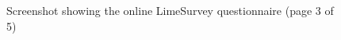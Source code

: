 \begin{figure}
\ContinuedFloat
 \centering
 \caption[Screenshot showing the online questionnaire (page 3 of 5)]{Screenshot showing the online LimeSurvey questionnaire (page 3 of 5)}
 \label{appendix:appendicies:developer-suvery-one-page-003}
\end{figure}


